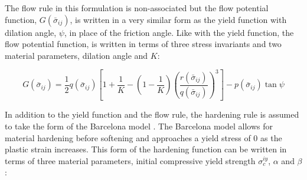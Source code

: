 





The flow rule in this formulation is non-associated but the flow potential function, $G\left(\bar{\sigma}_{ij}\right)$, is written in a very similar form as the yield function with dilation angle, $\psi$, in place of the friction angle. Like with the yield function, the flow potential function, is written in terms of three stress invariants and two material parameters, dilation angle and $K$:

\begin{equation}
G\left(\bar{\sigma}_{ij}\right)=\frac{1}{2}q\left(\bar{\sigma}_{ij}\right)\left [ 1+\frac{1}{K}-\left ( 1-\frac{1}{K} \right )\left ( \frac{r\left(\bar{\sigma}_{ij}\right)}{q\left(\bar{\sigma}_{ij}\right)} \right )^3 \right ]-p\left(\bar{\sigma}_{ij}\right)\tan\psi\label{eqn:const11}
\end{equation}

In addition to the yield function and the flow rule, the hardening rule is assumed to take the form of the Barcelona model \cite{lubliner_plastic-damage_1989}. The Barcelona model allows for material hardening before softening and approaches a yield stress of 0 as the plastic strain increases.  This form of the hardening function can be written in terms of three material parameters, initial compressive yield strength $\sigma_c^{iy}$, $\alpha$ and $\beta$:

